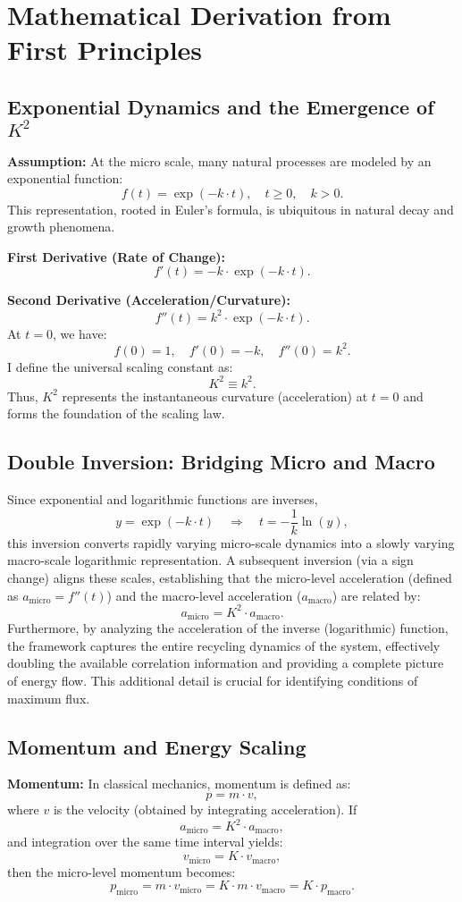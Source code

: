 \documentclass{article}
\begin{document}
\section{Mathematical Derivation from First Principles}
\subsection{Exponential Dynamics and the Emergence of \(K^2\)}
\textbf{Assumption:} At the micro scale, many natural processes are modeled by an exponential function:
\[
f(t) = \exp(-k \cdot t), \quad t \geq 0, \quad k > 0.
\]
This representation, rooted in Euler's formula, is ubiquitous in natural decay and growth phenomena.

\textbf{First Derivative (Rate of Change):}
\[
f'(t) = -k \cdot \exp(-k \cdot t).
\]

\textbf{Second Derivative (Acceleration/Curvature):}
\[
f''(t) = k^2 \cdot \exp(-k \cdot t).
\]
At \(t = 0\), we have:
\[
f(0)=1,\quad f'(0)=-k,\quad f''(0)= k^2.
\]
I define the universal scaling constant as:
\[
K^2 \equiv k^2.
\]
Thus, \(K^2\) represents the instantaneous curvature (acceleration) at \(t = 0\) and forms the foundation of the scaling law.

\subsection{Double Inversion: Bridging Micro and Macro}
Since exponential and logarithmic functions are inverses,
\[
y = \exp(-k \cdot t) \quad \Longrightarrow \quad t = -\frac{1}{k}\ln(y),
\]
this inversion converts rapidly varying micro-scale dynamics into a slowly varying macro-scale logarithmic representation. A subsequent inversion (via a sign change) aligns these scales, establishing that the micro-level acceleration (defined as \(a_{\text{micro}} = f''(t)\)) and the macro-level acceleration (\(a_{\text{macro}}\)) are related by:
\[
a_{\text{micro}} = K^2 \cdot a_{\text{macro}}.
\]
Furthermore, by analyzing the acceleration of the inverse (logarithmic) function, the framework captures the entire recycling dynamics of the system, effectively doubling the available correlation information and providing a complete picture of energy flow. This additional detail is crucial for identifying conditions of maximum flux.

\subsection{Momentum and Energy Scaling}
\textbf{Momentum:} In classical mechanics, momentum is defined as:
\[
p = m \cdot v,
\]
where \(v\) is the velocity (obtained by integrating acceleration). If
\[
a_{\text{micro}} = K^2 \cdot a_{\text{macro}},
\]
and integration over the same time interval yields:
\[
v_{\text{micro}} = K \cdot v_{\text{macro}},
\]
then the micro-level momentum becomes:
\[
p_{\text{micro}} = m \cdot v_{\text{micro}} = K \cdot m \cdot v_{\text{macro}} = K \cdot p_{\text{macro}}.
\]
\end{document}

